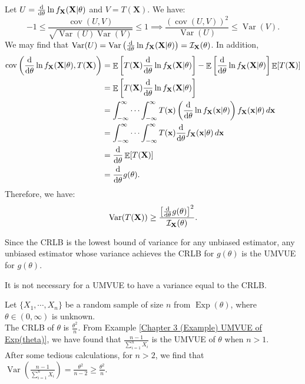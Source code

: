 \documentclass{huhtakm-template-book-v2}
\DeclareMathOperator{\E}{\mathbb{E}}
\DeclareMathOperator{\Var}{Var}
\DeclareMathOperator{\cov}{cov}
\DeclareMathOperator{\Exp}{Exp}
\begin{document}
    \begin{proofing}
        Let $U=\odv*{\ln{f_{\mathbf{X}}(\mathbf{X}|\theta)}}{\theta}$ and $V=T(\mathbf{X})$. We have:
        \begin{equation*}
            -1\leq\frac{\cov(U,V)}{\sqrt{\Var(U)\Var(V)}}\leq 1\implies\frac{(\cov(U,V))^{2}}{\Var(U)}\leq\Var(V).
        \end{equation*}
        We may find that $\Var(U)=\Var\left(\odv*{\ln{f_{\mathbf{X}}(\mathbf{X}|\theta)}}{\theta}\right)=\mathcal{I}_{\mathbf{X}}(\theta)$. In addition,
        \begin{align*}
            \cov\left(\odv*{\ln{f_{\mathbf{X}}(\mathbf{X}|\theta)}}{\theta},T(\mathbf{X})\right)&=\E\left[T(\mathbf{X})\odv*{\ln{f_{\mathbf{X}}(\mathbf{X}|\theta)}}{\theta}\right]-\E\left[\odv*{\ln{f_{\mathbf{X}}(\mathbf{X}|\theta)}}{\theta}\right]\E[T(\mathbf{X})]\\
            &=\E\left[T(\mathbf{X})\odv*{\ln{f_{\mathbf{X}}(\mathbf{X}|\theta)}}{\theta}\right]\\
            &=\int_{-\infty}^\infty\cdots\int_{-\infty}^\infty T(\mathbf{x})\left(\odv*{\ln{f_{\mathbf{X}}(\mathbf{x}|\theta)}}{\theta}\right)f_{\mathbf{X}}(\mathbf{x}|\theta)\,d\mathbf{x}\\
            &=\int_{-\infty}^\infty\cdots\int_{-\infty}^\infty T(\mathbf{x})\odv*{f_{\mathbf{X}}(\mathbf{x}|\theta)}{\theta}\,d\mathbf{x}\\
            &=\odv*{\E[T(\mathbf{X})]}{\theta}\\
            &=\odv*{g(\theta)}{\theta}.
        \end{align*}
        Therefore, we have:
        \begin{equation*}
            \Var(T(\mathbf{X}))\geq\frac{\left[\odv*{g(\theta)}{\theta}\right]^{2}}{\mathcal{I}_{\mathbf{X}}(\theta)}.
        \end{equation*}
    \end{proofing}
    \begin{rem}
        Since the CRLB is the lowest bound of variance for any unbiased estimator, any unbiased estimator whose variance achieves the CRLB for $g(\theta)$ is the UMVUE for $g(\theta)$.
    \end{rem}
    \begin{rem}
        It is not necessary for a UMVUE to have a variance equal to the CRLB.
    \end{rem}
    \begin{eg}
        Let $\{X_{1},\cdots,X_{n}\}$ be a random sample of size $n$ from $\Exp(\theta)$, where $\theta\in(0,\infty)$ is unknown.\\
        The CRLB of $\theta$ is $\frac{\theta^{2}}{n}$. From Example \ref{Chapter 3 (Example) UMVUE of Exp(theta)}, we have found that $\frac{n-1}{\sum_{i=1}^{n}X_{i}}$ is the UMVUE of $\theta$ when $n>1$.\\
        After some tedious calculations, for $n>2$, we find that $\Var\left(\frac{n-1}{\sum_{i=1}^{n}X_{i}}\right)=\frac{\theta^{2}}{n-2}\geq\frac{\theta^{2}}{n}$.
    \end{eg}
    \newpage
\end{document}
